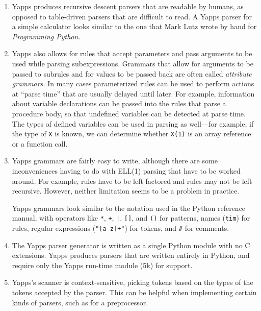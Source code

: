 \documentclass[10pt]{article}
\begin{document}
\begin{enumerate}
   
 \item Yapps produces recursive descent parsers that are readable by
   humans, as opposed to table-driven parsers that are difficult to
   read.  A Yapps parser for a simple calculator looks similar to the
   one that Mark Lutz wrote by hand for \emph{Programming Python.}
        
 \item Yapps also allows for rules that accept parameters and pass
   arguments to be used while parsing subexpressions.  Grammars that
   allow for arguments to be passed to subrules and for values to be
   passed back are often called \emph{attribute grammars.}  In many
   cases parameterized rules can be used to perform actions at ``parse
   time'' that are usually delayed until later.  For example,
   information about variable declarations can be passed into the
   rules that parse a procedure body, so that undefined variables can
   be detected at parse time.  The types of defined variables can be
   used in parsing as well---for example, if the type of {\tt X} is
   known, we can determine whether {\tt X(1)} is an array reference or 
   a function call.
   
 \item Yapps grammars are fairly easy to write, although there are
   some inconveniences having to do with ELL(1) parsing that have to be
   worked around.  For example, rules have to be left factored and
   rules may not be left recursive.  However, neither limitation seems 
   to be a problem in practice.  
   
   Yapps grammars look similar to the notation used in the Python
   reference manual, with operators like \verb:*:, \verb:+:, \verb:|:,
   \verb:[]:, and \verb:(): for patterns, names ({\tt tim}) for rules,
   regular expressions (\verb:"[a-z]+":) for tokens, and \verb:#: for
   comments.

 \item The Yapps parser generator is written as a single Python module
   with no C extensions.  Yapps produces parsers that are written
   entirely in Python, and require only the Yapps run-time module (5k)
   for support.
   
 \item Yapps's scanner is context-sensitive, picking tokens based on
   the types of the tokens accepted by the parser.  This can be
   helpful when implementing certain kinds of parsers, such as for a
   preprocessor.

\end{enumerate}
\end{document}
